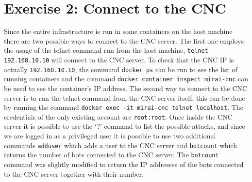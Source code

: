 \section{Exercise 2: Connect to the CNC}
Since the entire infrastructure is run in some containers on the host machine there are two possible ways to connect to the CNC server. The first one employs the usage of the telnet command run from the host machine, \texttt{telnet 192.168.10.10} will connect to the CNC server. To check that the CNC IP is actually \texttt{192.168.10.10}, the command \texttt{docker ps} can be run to see the list of running containers and the command \texttt{docker container inspect mirai-cnc} can be used to see the container's IP address. The second way to connect to the CNC server is to run the telnet command from the CNC server itself, this can be done by running the command \texttt{docker exec -it mirai-cnc telnet localhost}. The credentials of the only existing account are \texttt{root:root}. Once inside the CNC server it is possible to use the `?' command to list the possible attacks, and since we are logged in as a privileged user it is possible to use two additional commands \texttt{adduser} which adds a user to the CNC server and \texttt{botcount} which returns the number of bots connected to the CNC server. The \texttt{botcount} command was slightly modified to return the IP addresses of the bots connected to the CNC server together with their number.

